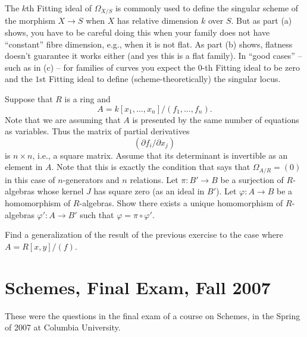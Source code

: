 \begin{remark}
\label{remark-fitting-omega-not-sings}
The $k$th Fitting ideal of $\Omega_{X/S}$ is commonly used
to define the singular scheme of the morphism $X \to S$ when $X$ has relative
dimension $k$ over $S$. But as part (a) shows, you have to be careful doing
this when your family does not have ``constant'' fibre dimension, e.g., when
it is not flat. As part (b) shows, flatness doesn't guarantee it works either
(and yes this is a flat family). In ``good cases'' -- such as in (c) -- for
families of curves you expect the $0$-th Fitting ideal to be zero and
the $1$st Fitting ideal to define (scheme-theoretically) the singular locus.
\end{remark}

\begin{exercise}
\label{exercise-formally-smooth}
Suppose that $R$ is a ring and
$$
A = k[x_1, \ldots, x_n]/(f_1, \ldots, f_n).
$$
Note that we are assuming that $A$ is presented by the same
number of equations as variables. Thus the matrix of partial
derivatives
$$
( \partial f_i / \partial x_j )
$$
is $n \times n$, i.e., a square matrix. Assume that
its determinant is invertible as an element in $A$. Note that
this is exactly the condition that says that $\Omega_{A/R} = (0)$
in this case of $n$-generators and $n$ relations.
Let $\pi : B' \to B$ be a surjection of $R$-algebras
whose kernel $J$ has square zero (as an ideal in $B'$).
Let $\varphi : A \to B$ be a homomorphism of $R$-algebras.
Show there exists a unique homomorphism of $R$-algebras
$\varphi' : A \to B'$ such that $\varphi = \pi \circ \varphi'$.
\end{exercise}

\begin{exercise}
\label{exercise-formally-smooth-one-equation}
Find a generalization
of the result of the previous exercise to the case where $A = R[x, y]/(f)$.
\end{exercise}



\section{Schemes, Final Exam, Fall 2007}
\label{section-final-exam-fall-2007}

\noindent
These were the questions in the final exam of a course on Schemes,
in the Spring of 2007 at Columbia University.

